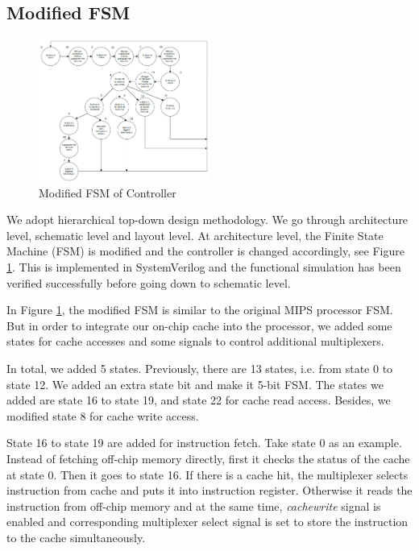 \documentclass[conference]{IEEEtran}
\begin{document}
\subsection{Modified FSM}

\begin{figure}[h!]
  \centering
    \includegraphics[width=0.5\textwidth]{fsm}
  \caption{Modified FSM of Controller}
  \label{fig:fsm}
\end{figure}

We adopt hierarchical top-down design methodology. We go through architecture
level, schematic level and layout level. At architecture level, the Finite
State Machine (FSM) is modified and the controller is changed accordingly, see
Figure \ref{fig:fsm}. This is implemented in SystemVerilog and the functional simulation has
been verified successfully before going down to schematic level.

In Figure \ref{fig:fsm}, the modified FSM is similar to the original MIPS processor FSM. But in order to integrate our on-chip cache into the processor, we added some states for cache accesses and some signals to control additional multiplexers.

In total, we added 5 states. Previously, there are 13 states, i.e. from state 0 to state 12. We added an extra state bit and make it 5-bit FSM. The states we added are state 16 to state 19, and state 22 for cache read access. Besides, we modified state 8 for cache write access.

State 16 to state 19 are added for instruction fetch. Take state 0 as an example. Instead of fetching off-chip memory directly, first it checks the status of the cache at state 0. Then it goes to state 16. If there is a cache hit, the multiplexer selects instruction from cache and puts it into instruction register. Otherwise it reads the instruction from off-chip memory and at the same time, \textit{cachewrite} signal is enabled and corresponding multiplexer select signal is set to store the instruction to the cache simultaneously. 
\end{document}
